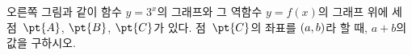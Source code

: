 \noindent\begin{minipage}[t]{0.58\linewidth}\vspace{0pt}\raggedright 오른쪽 그림과 같이 함수 $y=3^x$의 그래프와 그 역함수 $y=f(x)$의 그래프 위에 세 점~$\pt{A}$, $\pt{B}$, $\pt{C}$가 있다. 점~$\pt{C}$의 좌표를 $(a{,}\mkern3mu\mathopen{}b)$라 할 때, $a+b$의 값을 구하시오. \end{minipage}\hfill\begin{minipage}[t]{0.4\linewidth}\vspace{0pt}\centering \resizebox{\ifdim\width>\linewidth\linewidth\else\width\fi}{!}{}\end{minipage}\par
